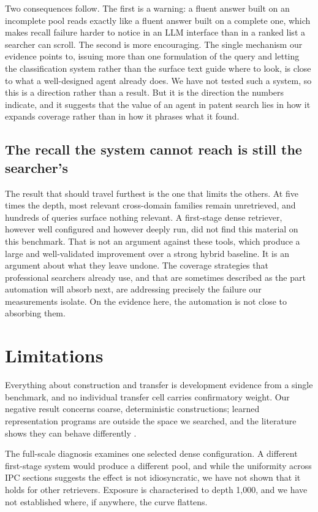 \documentclass[preprint,11pt,authoryear]{elsarticle}          %
\begin{document}
Two consequences follow. The first is a warning: a fluent answer built on an incomplete
pool reads exactly like a fluent answer built on a complete one, which makes recall
failure harder to notice in an LLM interface than in a ranked list a searcher can scroll.
The second is more encouraging. The single mechanism our evidence points to, issuing more
than one formulation of the query and letting the classification system rather than the
surface text guide where to look, is close to what a well-designed agent already does. We
have not tested such a system, so this is a direction rather than a result. But it is the
direction the numbers indicate, and it suggests that the value of an agent in patent
search lies in how it expands coverage rather than in how it phrases what it found.

\subsection{The recall the system cannot reach is still the searcher's}

The result that should travel furthest is the one that limits the others. At five times the depth, most relevant cross-domain families remain unretrieved, and hundreds of queries surface nothing relevant. A first-stage dense retriever, however well configured and however deeply run, did not find this material on this benchmark. That is not an argument against these tools, which produce a large and well-validated improvement over a strong hybrid baseline. It is an argument about what they leave undone. The coverage strategies that professional searchers already use, and that are sometimes described as the part automation will absorb next, are addressing precisely the failure our measurements isolate. On the evidence here, the automation is not close to absorbing them.

\section{Limitations}
\label{sec:limitations}

Everything about construction and transfer is development evidence from a single benchmark, and no individual transfer cell carries confirmatory weight. Our negative result concerns coarse, deterministic constructions; learned representation programs are outside the space we searched, and the literature shows they can behave differently \citep{onuallain2026autoindex}.

The full-scale diagnosis examines one selected dense configuration. A different first-stage system would produce a different pool, and while the uniformity across IPC sections suggests the effect is not idiosyncratic, we have not shown that it holds for other retrievers. Exposure is characterised to depth 1{,}000, and we have not established where, if anywhere, the curve flattens.
\end{document}
